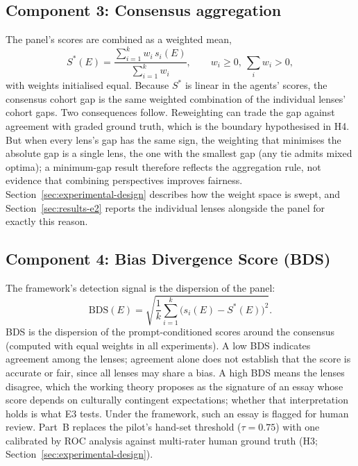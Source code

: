 \subsection*{Component 3: Consensus aggregation}
The panel's scores are combined as a weighted mean,
\begin{equation}
\label{eq:consensus}
S^{*}(E) = \frac{\sum_{i=1}^{k} w_i\, s_i(E)}{\sum_{i=1}^{k} w_i},
\qquad w_i \geq 0,\ \textstyle\sum_i w_i > 0,
\end{equation}
with weights initialised equal. Because $S^{*}$ is linear in the
agents' scores, the consensus cohort gap is the same weighted
combination of the individual lenses' cohort gaps. Two consequences
follow. Reweighting can trade the gap against agreement with graded
ground truth, which is the boundary hypothesised in H4. But when
every lens's gap has the same sign, the weighting that minimises the
absolute gap is a single lens, the one with the smallest gap (any
tie admits mixed optima); a minimum-gap result therefore reflects
the aggregation rule, not evidence that combining perspectives
improves fairness. Section~\ref{sec:experimental-design}
describes how the weight space is swept, and
Section~\ref{sec:results-e2} reports the individual lenses alongside
the panel for exactly this reason.

\subsection*{Component 4: Bias Divergence Score (BDS)}
The framework's detection signal is the dispersion of the panel:
\begin{equation}
\label{eq:bds}
\mathrm{BDS}(E) = \sqrt{\frac{1}{k} \sum_{i=1}^{k}
  \bigl(s_i(E) - S^{*}(E)\bigr)^{2}}.
\end{equation}
BDS is the dispersion of the prompt-conditioned scores around the
consensus (computed with equal weights in all experiments). A low
BDS indicates agreement among the lenses; agreement alone does not
establish that the score is accurate or fair, since all lenses may
share a bias. A high BDS means the lenses disagree, which the working
theory proposes as the signature of an essay whose score depends on
culturally contingent expectations; whether that interpretation holds
is what E3 tests. Under the framework, such an essay is flagged for
human review. Part~B replaces the pilot's hand-set
threshold ($\tau = 0.75$) with one calibrated by ROC analysis against
multi-rater human ground truth (H3;
Section~\ref{sec:experimental-design}).

